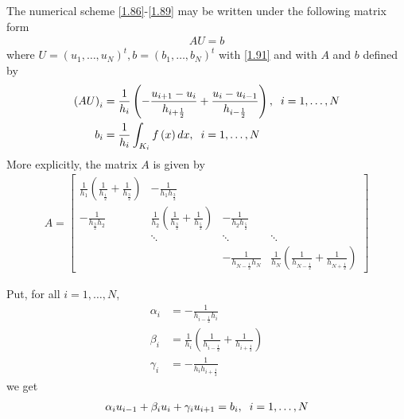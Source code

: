 \documentclass[a4paper]{article}
\numberwithin{equation}{section}
\begin{document}
The numerical scheme \eqref{1.86}-\eqref{1.89} may be written under the following matrix form
\begin{align}
\label{1.92}
AU=b
\end{align}
where $U = {\left( {{u_1}, \ldots ,{u_N}} \right)^t},b = {\left( {{b_1}, \ldots ,{b_N}} \right)^t}$ with \eqref{1.91} and with $A$ and $b$ defined by
\begin{align}
{\left( {AU} \right)_i} &= \frac{1}{{{h_i}}}\left( { - \frac{{{u_{i + 1}} - {u_i}}}{{{h_{i + \frac{1}{2}}}}} + \frac{{{u_i} - {u_{i - 1}}}}{{{h_{i - \frac{1}{2}}}}}} \right),\hspace{0.2cm}i = 1, \ldots ,N\\
{b_i} &= \frac{1}{{{h_i}}}\int_{{K_i}} {f\left( x \right)dx} ,\hspace{0.2cm}i = 1, \ldots ,N \label{1.94}
\end{align}
More explicitly, the matrix $A$ is given by
\begin{align}
\label{1.95}
A = \left[ {\begin{array}{*{20}{c}}
{\frac{1}{{{h_1}}}\left( {\frac{1}{{{h_{\frac{1}{2}}}}} + \frac{1}{{{h_{\frac{3}{2}}}}}} \right)}&{ - \frac{1}{{{h_1}{h_{\frac{3}{2}}}}}}&{}&{}\\
{ - \frac{1}{{{h_{\frac{3}{2}}}{h_2}}}}&{\frac{1}{{{h_2}}}\left( {\frac{1}{{{h_{\frac{3}{2}}}}} + \frac{1}{{{h_{\frac{5}{2}}}}}} \right)}&{ - \frac{1}{{{h_2}{h_{\frac{5}{2}}}}}}&{}\\
{}& \ddots & \ddots & \ddots \\
{}&{}&{ - \frac{1}{{{h_{N - \frac{1}{2}}}{h_N}}}}&{\frac{1}{{{h_N}}}\left( {\frac{1}{{{h_{N - \frac{1}{2}}}}} + \frac{1}{{{h_{N + \frac{1}{2}}}}}} \right)}
\end{array}} \right]
\end{align}

Put, for all $i=1,\ldots,N$,
\begin{align}
{\alpha _i} &=  - \frac{1}{{{h_{i - \frac{1}{2}}}{h_i}}}\\
{\beta _i} &= \frac{1}{{{h_i}}}\left( {\frac{1}{{{h_{i - \frac{1}{2}}}}} + \frac{1}{{{h_{i + \frac{1}{2}}}}}} \right)\\
{\gamma _i} &=  - \frac{1}{{{h_i}{h_{i + \frac{1}{2}}}}}
\end{align}
we get
\begin{align}
{\alpha _i}{u_{i - 1}} + {\beta _i}{u_i} + {\gamma _i}{u_{i + 1}} = {b_i},\hspace{0.2cm} i = 1, \ldots ,N
\end{align}
\end{document}
